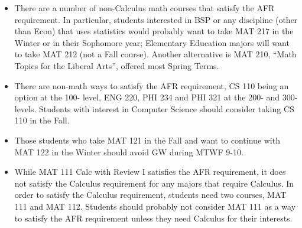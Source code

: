 \documentclass[12pt]{article}
\begin{document}
\begin{itemize}
\item There are a number of non-Calculus math courses that satisfy the AFR requirement. In particular, students interested in BSP or any discipline (other than Econ) that uses statistics would probably want to take MAT 217 in the Winter or in their Sophomore year; Elementary Education majors will want to take MAT 212 (not a Fall course). Another alternative is MAT 210, ``Math Topics for the Liberal Arts'', offered most Spring Terms.
\item There are non-math ways to satisfy the AFR requirement, CS 110 being an option at the 100- level, ENG 220, PHI 234 and PHI 321 at the 200- and 300- levels. Students with interest in Computer Science should consider taking CS 110 in the Fall.
\item Those students who take MAT 121 in the Fall and want to continue with MAT 122 in the Winter should avoid GW during MTWF 9-10.
\item While MAT 111 Calc with Review I satisfies the AFR requirement, it does not satisfy the Calculus requirement for any majors that require Calculus. In order to satisfy the Calculus requirement, students need two courses, MAT 111 and MAT 112. Students should probably not consider MAT 111 as a way to satisfy the AFR requirement unless they need Calculus for their interests.
\end{itemize}
\end{document}
